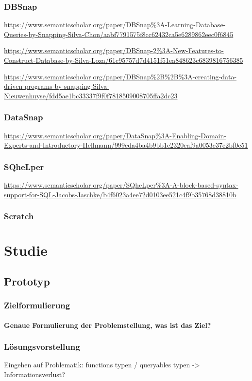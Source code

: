 \documentclass[oneside,a4paper,11pt,openright]{report}
\begin{document}
\subsection{DBSnap}
\parencite{silvaDBSnapLearning2015}
\url{https://www.semanticscholar.org/paper/DBSnap\%3A-Learning-Database-Queries-by-Snapping-Silva-Chon/aabf7791575f8cc62432ca5e6289862eec0f6845}

\url{https://www.semanticscholar.org/paper/DBSnap-2\%3A-New-Features-to-Construct-Database-by-Silva-Loza/61c95757d7d4151f51ea848623c6839816756385}

\url{https://www.semanticscholar.org/paper/DBSnap\%2B\%2B\%3A-creating-data-driven-programs-by-snapping-Silva-Nieuwenhuyse/fdd5ae1bc33337f9f0f7818509008705ffa2dc23}

\subsection{DataSnap}
\parencite{hellmannDataSnapEnabling2015}
\url{https://www.semanticscholar.org/paper/DataSnap\%3A-Enabling-Domain-Experts-and-Introductory-Hellmann/999eda4ba4b9bb1c2320eaf9a0053e37e2bf0c51}

\subsection{SQheLper}
\parencite{jacobsSQheLperBlockbased2021}
\url{https://www.semanticscholar.org/paper/SQheLper\%3A-A-block-based-syntax-support-for-SQL-Jacobs-Jaschke/b4f6023a4ee72d0103ee521c4f9b35768d38810b}
\subsection{Scratch}


\chapter{Studie}
\section{Prototyp}
\subsection{Zielformulierung}
\subsubsection{Genaue Formulierung der Problemstellung, was ist das Ziel?}
\subsection{Lösungsvorstellung}
Eingehen auf Problematik: functions typen / queryables typen -> Informationsverlust?
\end{document}
